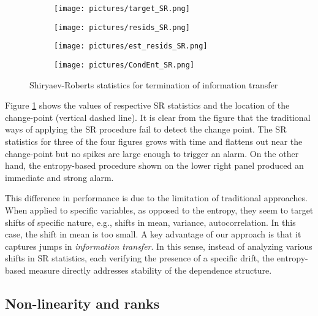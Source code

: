 \begin{figure}[H]
     \begin{subfigure}[b]{0.5\textwidth}
         \centering
         \texttt{[image: pictures/target\_SR.png]}
     \end{subfigure}
     \hfill
     \begin{subfigure}[b]{0.5\textwidth}
         \centering
         \texttt{[image: pictures/resids\_SR.png]}

     \end{subfigure}
     \vfill
     \begin{subfigure}[b]{0.5\textwidth}
         \centering
         \texttt{[image: pictures/est\_resids\_SR.png]}
     \end{subfigure}
    \hfill
     \begin{subfigure}[b]{0.5\textwidth}
         \centering
         \texttt{[image: pictures/CondEnt\_SR.png]}
     \end{subfigure}
        \caption{Shiryaev-Roberts statistics for termination of information transfer}
        \label{fig:SR_traditional}
\end{figure}

Figure \ref{fig:SR_traditional} shows the values of respective SR statistics and the location of the change-point (vertical dashed line). It is clear from the figure that the traditional ways of applying the SR procedure fail to detect the change point. The SR statistics for three of the four figures grows with time and flattens out near the change-point but no spikes are large enough to trigger an alarm. On the other hand, the entropy-based procedure shown on the lower right panel produced an immediate and strong alarm. 

This difference in performance is due to the limitation of traditional approaches. When applied to specific variables, as opposed to the entropy, they seem to target shifts of specific nature, e.g., shifts in mean, variance, autocorrelation. In this case, the shift in mean is too small. A key advantage of our approach is that it captures jumps in \emph{information transfer}. In this sense, instead of analyzing various shifts in SR statistics, each verifying the presence of a specific drift, the entropy-based measure directly addresses stability of the dependence structure.  

\subsection{Non-linearity and ranks}

